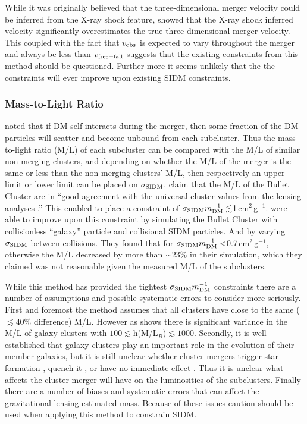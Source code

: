 While it was originally believed that the three-dimensional merger velocity could be inferred from the X-ray shock feature, \citet{Springel:2007bg} showed that the X-ray shock inferred velocity significantly overestimates the true three-dimensional merger velocity.
This coupled with the fact that $v_{\rm obs}$ is expected to vary throughout the merger and always be less than $v_{\rm free-fall}$ suggests that the existing constraints from this method should be questioned.
Further more it seems unlikely that the the constraints will ever improve upon existing SIDM constraints.

\subsubsection{Mass-to-Light Ratio}\label{section:MLR}

\citet{Markevitch:2004dl} noted that if DM self-interacts during the merger, then some fraction of the DM particles will scatter and become unbound from each subcluster.
Thus the mass-to-light ratio (M/L) of each subcluster can be compared with the M/L of similar non-merging clusters, and depending on whether the M/L of the merger is the same or less than the non-merging clusters' M/L, then respectively an upper limit or lower limit can be placed on $\sigma_{\rm SIDM}$.
\citet{Clowe:2004eq} claim that the M/L of the Bullet Cluster are in ``good agreement with the universal cluster values from the lensing analyses \citep[e.g.,][]{Mellier:1999dh, Dahle:2000uz}.''
This enabled \citet{Markevitch:2004dl} to place a constraint of $\sigma_{\rm SIDM}m^{-1}_{\rm DM} \lesssim$1\,cm$^2$\,g$^{-1}$.
\citet{Randall:2008hs} were able to improve upon this constraint by simulating the Bullet Cluster with collisionless ``galaxy'' particle and collisional SIDM particles.
And by varying $\sigma_{\rm SIDM}$ between collisions.
They found that for $\sigma_{\rm SIDM}m^{-1}_{\rm DM} <$0.7\,cm$^2$\,g$^{-1}$, otherwise the M/L decreased by more than $\sim 23\%$ in their simulation, which they claimed was not reasonable given the measured M/L of the subclusters.

While this method has provided the tightest  $\sigma_{\rm SIDM}m^{-1}_{\rm DM} $ constraints there are a number of assumptions and possible systematic errors to consider more seriously.
First and foremost the method assumes that all clusters have close to the same ($\lesssim$40\% difference) M/L.
However as \citet{Dahle:2000uz} shows there is significant variance in the M/L of galaxy clusters with $100 \lesssim$h(M/L$_B$)$\lesssim 1000$. 
Secondly, it is well established that galaxy clusters play an important role in the evolution of their member galaxies, but it is still unclear whether cluster mergers trigger star formation \citep[e.g.][]{Miller:2003kx,Owen:2005dx,Ferrari:2005es,Hwang:2009ip}, quench it \citep{Poggianti:2004ca}, or have no immediate effect \citep{Chung:2010ds}.
Thus it is unclear what affects the cluster merger will have on the luminosities of the subclusters.
Finally there are a number of biases \citep[see e.g.][]{Noh:2010vt} and systematic errors \citep[][discuss several]{Randall:2008hs} that can affect the gravitational lensing estimated mass. 
Because of these issues caution should be used when applying this method to constrain SIDM.

